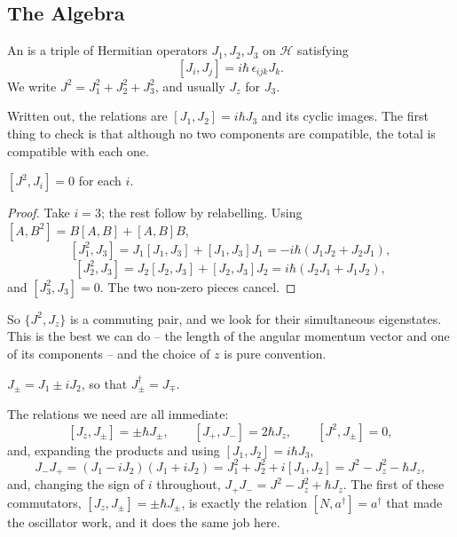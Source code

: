 \subsection{The Algebra}

\begin{definition}
    An  is a triple of Hermitian operators $J_1, J_2, J_3$ on $\mathcal{H}$ satisfying
    $$
    [J_i, J_j] = i \hbar \, \epsilon_{ijk} J_k.
    $$
    We write $J^2 = J_1^2 + J_2^2 + J_3^2$, and usually $J_z$ for $J_3$.
\end{definition}

Written out, the relations are $[J_1,J_2] = i\hbar J_3$ and its cyclic images. The first thing to check is that although no two components are compatible, the total is compatible with each one.

\begin{proposition}
    $[J^2, J_i] = 0$ for each $i$.
\end{proposition}
\begin{proof}
    Take $i = 3$; the rest follow by relabelling. Using $[A, B^2] = B[A,B] + [A,B]B$,
    $$
    [J_1^2, J_3] = J_1[J_1,J_3] + [J_1,J_3]J_1 = -i\hbar(J_1 J_2 + J_2 J_1),
    $$
    $$
    [J_2^2, J_3] = J_2[J_2,J_3] + [J_2,J_3]J_2 = i\hbar(J_2 J_1 + J_1 J_2),
    $$
    and $[J_3^2, J_3] = 0$. The two non-zero pieces cancel.
\end{proof}

So $\{J^2, J_z\}$ is a commuting pair, and we look for their simultaneous eigenstates. This is the best we can do -- the length of the angular momentum vector and one of its components -- and the choice of $z$ is pure convention.

\begin{definition}
    $J_\pm = J_1 \pm i J_2$, so that $J_\pm^\dagger = J_\mp$.
\end{definition}

The relations we need are all immediate:
$$
[J_z, J_\pm] = \pm \hbar J_\pm, \qquad [J_+, J_-] = 2\hbar J_z, \qquad [J^2, J_\pm] = 0,
$$
and, expanding the products and using $[J_1,J_2] = i\hbar J_3$,
$$
J_-J_+ = (J_1-iJ_2)(J_1+iJ_2) = J_1^2 + J_2^2 + i[J_1,J_2] = J^2 - J_z^2 - \hbar J_z,
$$
and, changing the sign of $i$ throughout, $J_+J_- = J^2 - J_z^2 + \hbar J_z$. The first of these commutators, $[J_z, J_\pm] = \pm\hbar J_\pm$, is exactly the relation $[N, a^\dagger] = a^\dagger$ that made the oscillator work, and it does the same job here.

